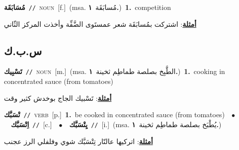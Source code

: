 \documentclass[10pt,a4paper,twoside]{article} %
\begin{document}
\begin{multicols}{2}
{\setlength\topsep{0pt}\textbf{\foreignlanguage{arabic}{مُسَابَقَة}}\ {\color{gray}\texttt{//}\color{black}}\ \textsc{noun}\ [f.]\ \color{gray}(msa. \foreignlanguage{arabic}{مُسابَقَة}~\foreignlanguage{arabic}{\textbf{١.}})\color{black}\ \textbf{1.}~competition\  \begin{flushright}\color{gray}\foreignlanguage{arabic}{\textbf{\underline{\foreignlanguage{arabic}{أمثلة}}}: اشتركت بمُسابَقَة شعر عمستَوى الضَّفِّة وأخذت المركز الثّاني}\end{flushright}\color{black}} \vspace{2mm}

\vspace{-3mm}
\subsection*{\color{blue}\foreignlanguage{arabic}{س.ب.ك}\color{blue}{}} 

{\setlength\topsep{0pt}\textbf{\foreignlanguage{arabic}{تَسْبِيك}}\ {\color{gray}\texttt{//}\color{black}}\ \textsc{noun}\ [m.]\ \color{gray}(msa. \foreignlanguage{arabic}{الطَّبِخ بصلصة طماطِم ثخينة}~\foreignlanguage{arabic}{\textbf{١.}})\color{black}\ \textbf{1.}~cooking in concentrated sauce (from tomatoes)\  \begin{flushright}\color{gray}\foreignlanguage{arabic}{\textbf{\underline{\foreignlanguage{arabic}{أمثلة}}}: تَسْبيك الجاج بوخدش كثير وقت}\end{flushright}\color{black}} \vspace{2mm}

{\setlength\topsep{0pt}\textbf{\foreignlanguage{arabic}{تْسَبَّك}}\ {\color{gray}\texttt{//}\color{black}}\ \textsc{verb}\ [p.]\ \textbf{1.}~be cooked in concentrated sauce (from tomatoes)\ \ $\bullet$\ \ \setlength\topsep{0pt}\textbf{\foreignlanguage{arabic}{اِتْسَبَّك}}\ {\color{gray}\texttt{//}\color{black}}\ [c.]\ \ $\bullet$\ \ \setlength\topsep{0pt}\textbf{\foreignlanguage{arabic}{يِتْسَبَّك}}\ {\color{gray}\texttt{//}\color{black}}\ [i.]\ \color{gray}(msa. \foreignlanguage{arabic}{يُطْبَخ بصلصة طماطِم ثخينة}~\foreignlanguage{arabic}{\textbf{١.}})\color{black}\  \begin{flushright}\color{gray}\foreignlanguage{arabic}{\textbf{\underline{\foreignlanguage{arabic}{أمثلة}}}: اتركيها عالنّار تِتْسَبَّك شوي وفلفلي الرز عجنب}\end{flushright}\color{black}} \vspace{2mm}


\end{multicols}
\end{document}
